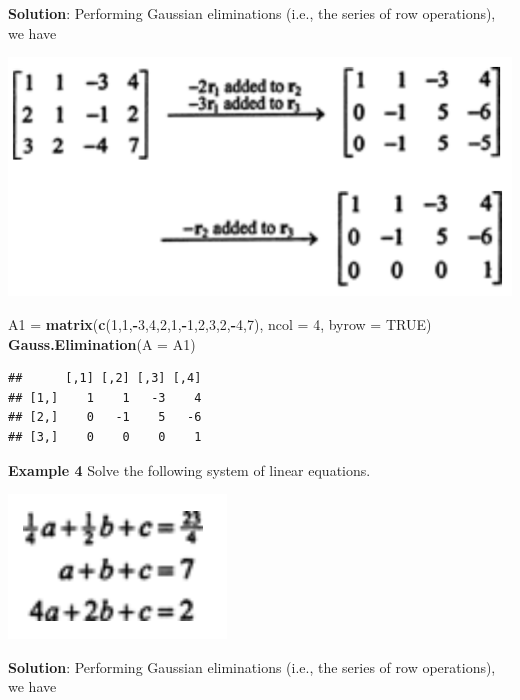 \documentclass[
]{book}
\newenvironment{Shaded}{\begin{snugshade}}{\end{snugshade}}
\newcommand{\AttributeTok}[1]{\textcolor[rgb]{0.13,0.29,0.53}{#1}}
\newcommand{\ConstantTok}[1]{\textcolor[rgb]{0.56,0.35,0.01}{#1}}
\newcommand{\DecValTok}[1]{\textcolor[rgb]{0.00,0.00,0.81}{#1}}
\newcommand{\FunctionTok}[1]{\textcolor[rgb]{0.13,0.29,0.53}{\textbf{#1}}}
\newcommand{\NormalTok}[1]{#1}
\newcommand{\OtherTok}[1]{\textcolor[rgb]{0.56,0.35,0.01}{#1}}
\newcommand{\SpecialCharTok}[1]{\textcolor[rgb]{0.81,0.36,0.00}{\textbf{#1}}}
\begin{document}
\textbf{Solution}: Performing Gaussian eliminations (i.e., the series of row operations), we have

\begin{center}\includegraphics[width=0.55\linewidth]{img07/w07-LabExample03-sol} \end{center}

\begin{Shaded}
\begin{Highlighting}[]
\NormalTok{A1 }\OtherTok{=} \FunctionTok{matrix}\NormalTok{(}\FunctionTok{c}\NormalTok{(}\DecValTok{1}\NormalTok{,}\DecValTok{1}\NormalTok{,}\SpecialCharTok{{-}}\DecValTok{3}\NormalTok{,}\DecValTok{4}\NormalTok{,}\DecValTok{2}\NormalTok{,}\DecValTok{1}\NormalTok{,}\SpecialCharTok{{-}}\DecValTok{1}\NormalTok{,}\DecValTok{2}\NormalTok{,}\DecValTok{3}\NormalTok{,}\DecValTok{2}\NormalTok{,}\SpecialCharTok{{-}}\DecValTok{4}\NormalTok{,}\DecValTok{7}\NormalTok{), }\AttributeTok{ncol =} \DecValTok{4}\NormalTok{, }\AttributeTok{byrow =} \ConstantTok{TRUE}\NormalTok{)}
\FunctionTok{Gauss.Elimination}\NormalTok{(}\AttributeTok{A =}\NormalTok{ A1)}
\end{Highlighting}
\end{Shaded}

\begin{verbatim}
##      [,1] [,2] [,3] [,4]
## [1,]    1    1   -3    4
## [2,]    0   -1    5   -6
## [3,]    0    0    0    1
\end{verbatim}

\hfill\break

\textbf{Example 4} Solve the following system of linear equations.

\begin{center}\includegraphics[width=0.22\linewidth]{img07/w07-LabExample04-eq} \end{center}

\textbf{Solution}: Performing Gaussian eliminations (i.e., the series of row operations), we have
\end{document}
